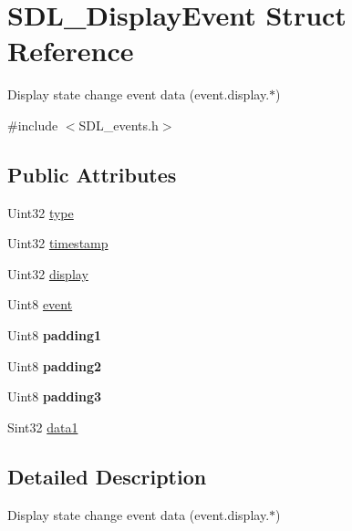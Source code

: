 \hypertarget{struct_s_d_l___display_event}{}\section{S\+D\+L\+\_\+\+Display\+Event Struct Reference}
\label{struct_s_d_l___display_event}


Display state change event data (event.\+display.$\ast$)  




{\ttfamily \#include $<$S\+D\+L\+\_\+events.\+h$>$}

\subsection*{Public Attributes}
\begin{DoxyCompactItemize}
\item 
Uint32 \mbox{\hyperlink{struct_s_d_l___display_event_a5f4993ce9c5289a2ac046ae7a6dff544}{type}}
\item 
Uint32 \mbox{\hyperlink{struct_s_d_l___display_event_a6c4cd9f63a2ff62032602193c9bf605d}{timestamp}}
\item 
Uint32 \mbox{\hyperlink{struct_s_d_l___display_event_af7159e813fb168a2fdfe5070e6026a39}{display}}
\item 
Uint8 \mbox{\hyperlink{struct_s_d_l___display_event_a4850a90c06e18146d6a2ac235cdd7336}{event}}
\item 
\mbox{\label{struct_s_d_l___display_event_a8a6937d7483828f3b9ac68fb79963e33}} 
Uint8 {\bfseries padding1}
\item 
\mbox{\label{struct_s_d_l___display_event_afe4ffe1364f1a29457636c8b74c7a3ce}} 
Uint8 {\bfseries padding2}
\item 
\mbox{\label{struct_s_d_l___display_event_aa4de9fba8f58fedb949894741ab0552b}} 
Uint8 {\bfseries padding3}
\item 
Sint32 \mbox{\hyperlink{struct_s_d_l___display_event_a4feb7329af16a060cc16d539e5cb13b5}{data1}}
\end{DoxyCompactItemize}


\subsection{Detailed Description}
Display state change event data (event.\+display.$\ast$) 


